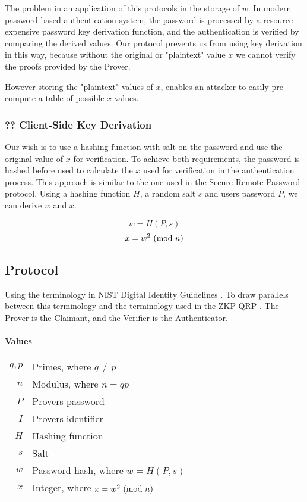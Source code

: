The problem in an application of this protocols in the storage of $w$. %
In modern password-based authentication system, the password is processed by a resource expensive password key derivation function, and the authentication is verified by comparing the derived values.
Our protocol prevents us from using key derivation in this way, because without the original or "plaintext" value $x$ we cannot verify the proofs provided by the Prover.

However storing the "plaintext" values of $x$, enables an attacker to easily pre-compute a table of possible $x$ values.

\subsubsection{?? Client-Side Key Derivation}
Our wish is to use a hashing function with salt on the password and use the original value of $x$ for verification. %
To achieve both requirements, the password is hashed before used to calculate the $x$ used for verification in the authentication process.
This approach is similar to the one used in \cite{wu1998secure} the Secure Remote Password protocol.
Using a hashing function $H$, a random salt $s$ and users password $P$, we can derive $w$ and $x$.

$$w = H(P, s)$$
$$x = w^2 \ (\mathrm{mod}\ n)$$

\subsection{Protocol} %
Using the terminology in NIST Digital Identity Guidelines \cite{grassi2017}. %
To draw parallels between this terminology and the terminology used in the ZKP-QRP \cite{GMR}. The Prover is the Claimant, and the Verifier is the Authenticator.

\paragraph{Values}
\begin{center}
	\begin{tabular}{rl} %
		$q, p$ & Primes, where $q \ne p$\\
		$n$ & Modulus, where $n = qp$\\
		$P$ & Provers password \\
		$I$ & Provers identifier \\
		$H$ & Hashing function \\
		$s$	& Salt\\
		$w$ & Password hash, where $w = H(P, s)$\\ %
		$x$ & Integer, where $x = w^2 \ (\mathrm{mod}\ n)$ %
	\end{tabular}
\end{center}


